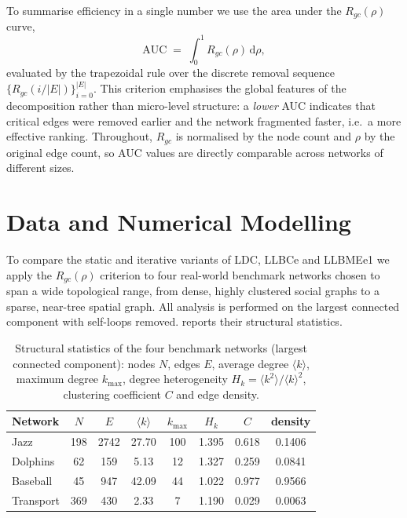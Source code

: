 \documentclass[runningheads,11pt]{article}
\begin{document}
To summarise efficiency in a single number we use the area under the
$R_{gc}(\rho)$ curve,
\begin{equation}
\mathrm{AUC} \;=\; \int_0^1 R_{gc}(\rho)\,\mathrm{d}\rho,
\label{eq:auc}
\end{equation}
evaluated by the trapezoidal rule over the discrete removal sequence
$\{R_{gc}(i/|E|)\}_{i=0}^{|E|}$. This criterion emphasises the global features
of the decomposition rather than micro-level structure: a \emph{lower} AUC
indicates that critical edges were removed earlier and the network fragmented
faster, i.e.\ a more effective ranking. Throughout, $R_{gc}$ is normalised by
the node count and $\rho$ by the original edge count, so AUC values are directly
comparable across networks of different sizes.

\section{Data and Numerical Modelling}
\label{sec:setup}
To compare the static and iterative variants of LDC, LLBCe and LLBMEe1 we apply
the $R_{gc}(\rho)$ criterion to four real-world benchmark networks chosen to
span a wide topological range, from dense, highly clustered social graphs to a
sparse, near-tree spatial graph. All analysis is performed on the largest
connected component with self-loops removed.  reports their
structural statistics.

\begin{table}[t]
\centering
\caption{Structural statistics of the four benchmark networks (largest
connected component): nodes $N$, edges $E$, average degree $\langle k\rangle$,
maximum degree $k_{\max}$, degree heterogeneity
$H_k=\langle k^2\rangle/\langle k\rangle^2$, clustering coefficient $C$ and edge
density.}
\label{tab:stats}
\begin{tabular}{lccccccc}
\toprule
Network & $N$ & $E$ & $\langle k\rangle$ & $k_{\max}$ & $H_k$ & $C$ & density \\
\midrule
Jazz & 198 & 2742 & 27.70 & 100 & 1.395 & 0.618 & 0.1406 \\
Dolphins & 62 & 159 & 5.13 & 12 & 1.327 & 0.259 & 0.0841 \\
Baseball & 45 & 947 & 42.09 & 44 & 1.022 & 0.977 & 0.9566 \\
Transport & 369 & 430 & 2.33 & 7 & 1.190 & 0.029 & 0.0063 \\
\bottomrule
\end{tabular}
\end{table}
\end{document}
